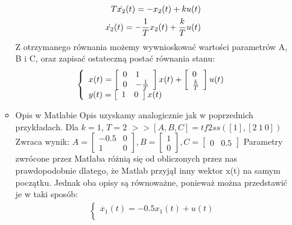 \documentclass[a4paper,10pt]{article}
\begin{document}
\begin{itemize}
\begin{itemize}
\begin{eqnarray}
		\nonumber T\dot{x_{2}}(t) = - x_{2}(t) + ku(t)\\
		\dot{x_{2}}(t) = -{1 \over T}x_{2}(t) + {k \over T}u(t)
	\end{eqnarray}
Z otrzymanego równania możemy wywnioskować wartości parametrów A, B i C, oraz zapisać ostateczną postać równania stanu:
	\begin{eqnarray}
		\left\{
			\begin{array}{l}
				x(t) = \left[ 
			\begin{array}{ll}
				0 & 1\\
				0 & -{1 \over T}
			\end{array}
		\right] x(t) + \left[ 
			\begin{array}{l}
				0\\
				{k \over T}
			\end{array}
		\right] u(t)\\
				y(t) = \left[ 
			\begin{array}{ll}
				1 & 0
			\end{array}
		\right]x(t)
			\end{array} \right.
	\end{eqnarray}
\item Opis w Matlabie
\newline Opis uzyskamy analogicznie jak w poprzednich przykładach.
\newline\newline Dla $k=1$, $T=2$
\newline $>>[A,B,C] = tf2ss([1], [2 \ 1 \ 0])$
\newline Zwraca wynik:
$A = \left[ \begin{array}{ll} -0.5 & 0\\ 1 & 0 \end{array} \right], B = \left[ \begin{array}{l} 1\\ 0 \end{array} \right], C = \left[ \begin{array}{ll} 0 & 0.5 \end{array} \right]$
\newline \newline Parametry zwrócone przez Matlaba różnią się od obliczonych przez nas prawdopodobnie dlatego, że Matlab przyjął inny wektor x(t) na samym początku. Jednak oba opisy są równoważne, ponieważ można przedstawić je w taki sposób:
	\begin{eqnarray}
		\nonumber \left\{ \begin{array}{l}
			\dot{x_{1}}(t) = -0.5x_{1}(t) + u(t)\\

\end{array}
\end{eqnarray}
\end{itemize}
\end{itemize}
\end{document}
